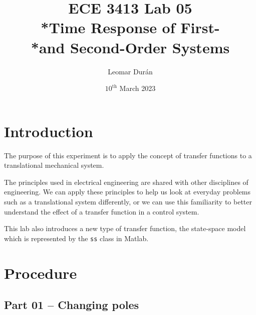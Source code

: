 \documentclass[12pt]{article}
\title{ECE 3413 Lab 05\\*Time Response of First-\\*and Second-Order Systems}
\author{Leomar Dur\'an}
\date{${10}^{\text{th}}$ March 2023}
\begin{document}
\maketitle
\newpage

\section{Introduction}

The purpose of this experiment is to apply the concept of transfer functions to a translational mechanical system.

The principles used in electrical engineering are shared with other disciplines of engineering.
We can apply these principles to help us look at everyday problems such as a translational system differently,
or we can use this familiarity to better understand the effect of a transfer function in a control system.

This lab also introduces a new type of transfer function, the state-space model which is represented by the \texttt{ss} class in Matlab.

\section{Procedure}

\subsection{Part 01 -- Changing poles}\label{ssc:part 01}
\end{document}
